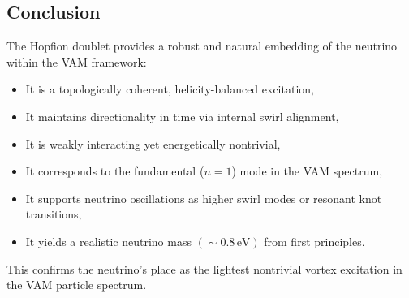 \subsection{Conclusion}

The Hopfion doublet provides a robust and natural embedding of the neutrino within the VAM framework:

\begin{itemize}
    \item It is a topologically coherent, helicity-balanced excitation,
    \item It maintains directionality in time via internal swirl alignment,
    \item It is weakly interacting yet energetically nontrivial,
    \item It corresponds to the fundamental (\(n = 1\)) mode in the VAM spectrum,
    \item It supports neutrino oscillations as higher swirl modes or resonant knot transitions,
    \item It yields a realistic neutrino mass \((\sim 0.8 \, \text{eV})\) from first principles.
\end{itemize}

This confirms the neutrino’s place as the lightest nontrivial vortex excitation in the VAM particle spectrum.